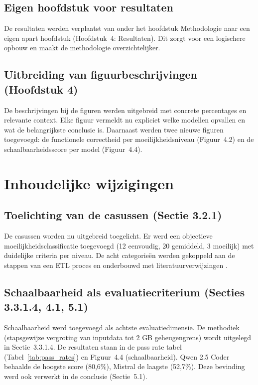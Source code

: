 \subsection{Eigen hoofdstuk voor resultaten}
De resultaten werden verplaatst van onder het hoofdstuk Methodologie naar een eigen apart hoofdstuk (Hoofdstuk~4: Resultaten). Dit zorgt voor een logischere opbouw en maakt de methodologie overzichtelijker.

\subsection{Uitbreiding van figuurbeschrijvingen (Hoofdstuk 4)}
De beschrijvingen bij de figuren werden uitgebreid met concrete percentages en relevante context. Elke figuur vermeldt nu expliciet welke modellen opvallen en wat de belangrijkste conclusie is. Daarnaast werden twee nieuwe figuren toegevoegd: de functionele correctheid per moeilijkheidsniveau (Figuur~4.2) en de schaalbaarheidsscore per model (Figuur~4.4).

\section{Inhoudelijke wijzigingen}

\subsection{Toelichting van de casussen (Sectie 3.2.1)}
De casussen worden nu uitgebreid toegelicht. Er werd een objectieve moeilijkheidsclassificatie toegevoegd (12 eenvoudig, 20 gemiddeld, 3 moeilijk) met duidelijke criteria per niveau. De acht categorieën werden gekoppeld aan de stappen van een ETL proces en onderbouwd met literatuurverwijzingen \autocite{Kabir2024,Nascimento2024,Wei2025}.

\subsection{Schaalbaarheid als evaluatiecriterium (Secties 3.3.1.4, 4.1, 5.1)}
Schaalbaarheid werd toegevoegd als achtste evaluatiedimensie. De methodiek (stapsgewijze vergroting van inputdata tot 2 GB geheugengrens) wordt uitgelegd in Sectie~3.3.1.4. De resultaten staan in de pass rate tabel (Tabel~\ref{tab:pass_rates}) en Figuur~4.4 (schaalbaarheid). Qwen 2.5 Coder behaalde de hoogste score (80,6\%), Mistral de laagste (52,7\%). Deze bevinding werd ook verwerkt in de conclusie (Sectie~5.1).


